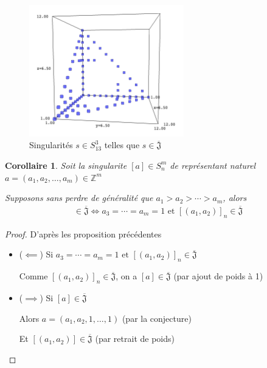 \documentclass{article}
\newtheorem{corollary}{Corollaire}
\begin{document}
\begin{figure}[h]
    \caption{Singularités $s \in S_{13}^3$ telles que $s \in \overline{\mathfrak{J}}$}
    \centering
    \includegraphics[width=0.6\textwidth]{singularite_j_strict_m3_n13}
\end{figure}

\begin{corollary}
    Soit la singularite $[a] \in S_n^m$ de représentant naturel $a = (a_1, a_2, \dots, a_m) \in \mathbb{Z}^m$

    Supposons sans perdre de généralité que $a_1 > a_2 > \cdots > a_m$, alors
    \begin{align*}
        [a] \in \overline{\mathfrak{J}} \iff a_3 = \cdots = a_m = 1 \text{ et } {[(a_1, a_2)]}_n \in \overline{\mathfrak{J}}
    \end{align*}
\end{corollary}

\begin{proof} D'après les proposition précédentes
    \begin{itemize}
        \item ($\impliedby$) Si $a_3 = \cdots = a_m = 1 \text{ et } {[(a_1, a_2)]}_n \in \overline{\mathfrak{J}}$
        
            Comme ${[(a_1, a_2)]}_n \in \overline{\mathfrak{J}}$, on a $[a] \in \overline{\mathfrak{J}}$ (par ajout de poids à 1)
        \item ($\implies$) Si $[a] \in \overline{\mathfrak{J}}$

            Alors $a = (a_1, a_2, 1, \dots, 1)$  (par la conjecture)

            Et $[(a_1, a_2)] \in \overline{\mathfrak{J}}$ (par retrait de poids)
    \end{itemize}
\end{proof}

\newpage
\end{document}
